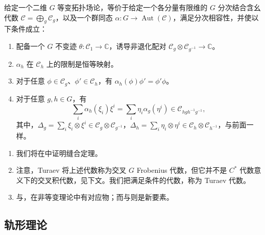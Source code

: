 \begin{theorem}\label{thm:2.11}
 给定一个二维 $G$ 等变拓扑场论，等价于给定一个各分量有限维的 $G$ 分次结合含幺代数 $\mathcal{C}=\bigoplus_g\mathcal{C}_g$，以及一个群同态 $\alpha\colon G\to\operatorname{Aut}(\mathcal{C})$，满足分次相容性，并使以下条件成立：
\begin{enumerate}[label=(\arabic*)]
\item\label{ax:2.11.1} 配备一个 $G$ 不变迹 $\theta\colon\mathcal{C}_1\to\mathbb{C}$，诱导非退化配对 $\mathcal{C}_g\otimes\mathcal{C}_{g^{-1}}\to\mathbb{C}$。
\item\label{ax:2.11.2} $\alpha_h$ 在 $\mathcal{C}_h$ 上的限制是恒等映射。
\item\label{ax:2.11.3} 对于任意 $\phi\in\mathcal{C}_g$、$\phi'\in\mathcal{C}_h$，有 $\alpha_h(\phi)\phi'=\phi'\phi$。
\item\label{ax:2.11.4} 对于任意 $g,h\in G$，有
\begin{equation}\label{eq:2.85}
\sum_i\alpha_h(\xi_i)\xi^i=\sum_i\eta_i\alpha_g(\eta^i)\in\mathcal{C}_{hgh^{-1}g^{-1}},
\end{equation}
其中，$\Delta_g=\sum_i\xi_i\otimes\xi^i\in\mathcal{C}_g\otimes\mathcal{C}_{g^{-1}}$，$\Delta_h=\sum_i\eta_i\otimes\eta^i\in\mathcal{C}_h\otimes\mathcal{C}_{h^{-1}}$，与前面一样。
\end{enumerate}
\end{theorem}

\begin{note}[2.12]\label{note:2.12}
\begin{enumerate}[label=(\arabic*)]
\item 我们将在中证明缝合定理。
\item 注意，Turaev 将上述代数称为交叉 $G$ Frobenius 代数，但它并不是 $C^*$ 代数意义下的交叉积代数，见下文。我们把满足条件的代数，称为 Turaev 代数。
\item {}与，在非等变理论中有对应物；而与则是新要素。
\end{enumerate}
\end{note}

\subsection{轨形理论}\label{sec:2.6.2}

